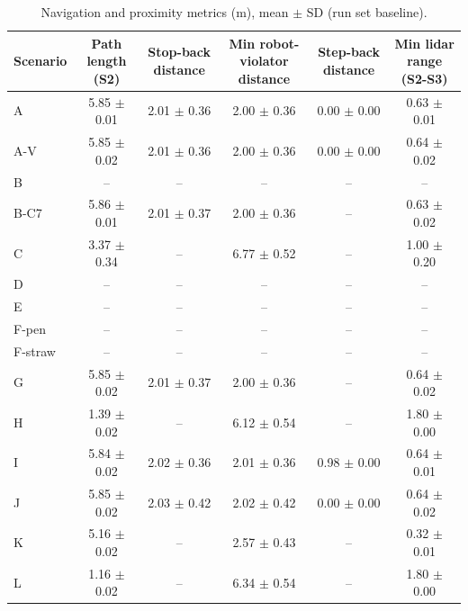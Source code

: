 \begin{table}[t]\centering\small
\caption{Navigation and proximity metrics (m), mean $\pm$ SD (run set baseline).}
\begin{tabular}{lccccc}
\toprule
Scenario & Path length (S2) & Stop-back distance & Min robot-violator distance & Step-back distance & Min lidar range (S2-S3) \\
\midrule
A & 5.85 $\pm$ 0.01 & 2.01 $\pm$ 0.36 & 2.00 $\pm$ 0.36 & 0.00 $\pm$ 0.00 & 0.63 $\pm$ 0.01 \\
A-V & 5.85 $\pm$ 0.02 & 2.01 $\pm$ 0.36 & 2.00 $\pm$ 0.36 & 0.00 $\pm$ 0.00 & 0.64 $\pm$ 0.02 \\
B & -- & -- & -- & -- & -- \\
B-C7 & 5.86 $\pm$ 0.01 & 2.01 $\pm$ 0.37 & 2.00 $\pm$ 0.36 & -- & 0.63 $\pm$ 0.02 \\
C & 3.37 $\pm$ 0.34 & -- & 6.77 $\pm$ 0.52 & -- & 1.00 $\pm$ 0.20 \\
D & -- & -- & -- & -- & -- \\
E & -- & -- & -- & -- & -- \\
F-pen & -- & -- & -- & -- & -- \\
F-straw & -- & -- & -- & -- & -- \\
G & 5.85 $\pm$ 0.02 & 2.01 $\pm$ 0.37 & 2.00 $\pm$ 0.36 & -- & 0.64 $\pm$ 0.02 \\
H & 1.39 $\pm$ 0.02 & -- & 6.12 $\pm$ 0.54 & -- & 1.80 $\pm$ 0.00 \\
I & 5.84 $\pm$ 0.02 & 2.02 $\pm$ 0.36 & 2.01 $\pm$ 0.36 & 0.98 $\pm$ 0.00 & 0.64 $\pm$ 0.01 \\
J & 5.85 $\pm$ 0.02 & 2.03 $\pm$ 0.42 & 2.02 $\pm$ 0.42 & 0.00 $\pm$ 0.00 & 0.64 $\pm$ 0.02 \\
K & 5.16 $\pm$ 0.02 & -- & 2.57 $\pm$ 0.43 & -- & 0.32 $\pm$ 0.01 \\
L & 1.16 $\pm$ 0.02 & -- & 6.34 $\pm$ 0.54 & -- & 1.80 $\pm$ 0.00 \\
\bottomrule
\end{tabular}
\end{table}
